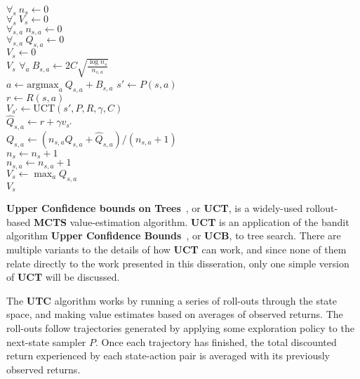 \begin{algorithm}[tb]
	\caption{$\mbox{UCT}(s, P, R, \gamma, C)$}
	\label{alg:ss}
	$\forall_{s} ~ n_{s} \leftarrow 0$\\
	$\forall_{s} ~ V_{s} \leftarrow 0$\\
	$\forall_{s,a} ~ n_{s,a} \leftarrow 0$\\
	$\forall_{s,a} ~ Q_{s,a} \leftarrow 0$\\

	 {
		$V_s \leftarrow 0$\\
		\Return $V_s$
	}
	 {
		$\forall_a ~ B_{s,a} \leftarrow 2 C \sqrt{\frac{\log n_{s}}{n_{s,a}}}$\\
		$a \leftarrow \mbox{argmax}_a ~ Q_{s,a}+B_{s,a}$
	}
	$s' \leftarrow P(s,a)$\\
	$r \leftarrow R(s,a)$\\
	$V_{s'} \leftarrow \mbox{UCT}(s', P, R, \gamma, C)$\\
	$\hat Q_{s,a} \leftarrow r+\gamma v_{s'}$\\
	$Q_{s,a} \leftarrow (n_{s,a}Q_{s,a}+\hat Q_{s,a})/(n_{s,a}+1)$\\
	$n_s \leftarrow n_s+1$\\
	$n_{s,a} \leftarrow n_{s,a}+1$\\
	$V_s \leftarrow \max_a Q_{s,a}$\\
	\Return $V_s$
\end{algorithm}

{\bf Upper Confidence bounds on Trees}~\cite{kocsis06}, or {\bf UCT}, is a widely-used rollout-based {\bf MCTS} value-estimation algorithm. {\bf UCT} is an application of the bandit algorithm {\bf Upper Confidence Bounds}~\cite{auer02}, or {\bf UCB}, to tree search. There are multiple variants to the details of how {\bf UCT} can work, and since none of them relate directly to the work presented in this disseration, only one simple version of {\bf UCT} will be discussed.

The {\bf UTC} algorithm works by running a series of roll-outs through the state space, and making value estimates based on averages of observed returns. The roll-outs follow trajectories generated by applying some exploration policy to the next-state sampler $P$. Once each trajectory has finished, the total discounted return experienced by each state-action pair is averaged with its previously observed returns.

